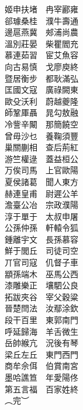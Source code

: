 \documentclass[a4paper]{article}
\begin{document}
\begin{multicols}{2}
\begin{huge}
姬申扶堵　冉宰酈雍\\
郤璩桑桂　濮牛壽通\\
邊扈燕冀　郟浦尚農\\
溫別莊晏　柴瞿閻充\\
慕連茹習　宦艾魚容\\
向古易慎　戈廖庾終\\
暨居衡步　都耿滿弘\\
匡國文寇　廣祿闕東\\
歐殳沃利　蔚越夔隆\\
師鞏厙聶　晁勾敖融\\
冷訾辛闞　那簡饒空\\
曾毋沙乜　養鞠須豐\\
巢關蒯相　查后荊紅\\
游竺權逯　蓋益桓公\\
万俟司馬　上官歐陽\\
夏侯諸葛　聞人東方\\
赫連皇甫　尉遲公羊\\
澹臺公冶　宗政濮陽\\
淳于單于　太叔申屠\\
公孫仲孫　軒轅令狐\\
鍾離宇文　長孫慕容\\
鮮于閭丘　司徒司空\\
丌官司寇　仉督子車\\
顓孫端木　巫馬公西\\
漆雕樂正　壤駟公良\\
拓跋夾谷　宰父穀粱\\
晉楚閆法　汝鄢涂欽\\
段干百里　東郭南門\\
呼延歸海　羊舌微生\\
岳帥緱亢　況後有琴\\
梁丘左丘　東門西門\\
商牟佘佴　伯賞南宮\\
墨哈譙笪　年愛陽佟\\
第五言福　百家姓終\\
︵完︶

\end{huge}
\end{multicols}
\end{document}
